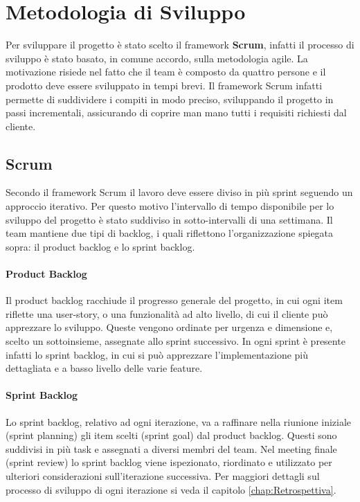 \section{Metodologia di Sviluppo}
Per sviluppare il progetto è stato scelto il framework \textbf{Scrum}, infatti il processo di sviluppo è stato basato, in comune accordo, sulla metodologia agile. La motivazione risiede nel fatto che il team è composto da quattro persone e il prodotto deve essere sviluppato in tempi brevi. Il framework Scrum infatti permette di suddividere i compiti in modo preciso, sviluppando il progetto in passi incrementali, assicurando di coprire man mano tutti i requisiti richiesti dal cliente.

    \subsection{Scrum}
    Secondo il framework Scrum il lavoro deve essere diviso in più sprint seguendo un approccio iterativo. Per questo motivo l'intervallo di tempo disponibile per lo sviluppo del progetto è stato suddiviso in sotto-intervalli di una settimana. 
    Il team mantiene due tipi di backlog, i quali riflettono l'organizzazione spiegata sopra: il product backlog e lo sprint backlog. 
    
    \paragraph{Product Backlog}Il product backlog racchiude il progresso generale del progetto, in cui ogni item riflette una user-story, o una funzionalità ad alto livello, di cui il cliente può apprezzare lo sviluppo. Queste vengono ordinate per urgenza e dimensione e, scelto un sottoinsieme, assegnate allo sprint successivo. In ogni sprint è presente infatti lo sprint backlog, in cui si può apprezzare l'implementazione più dettagliata e a basso livello delle varie feature. 

    \paragraph{Sprint Backlog} Lo sprint backlog, relativo ad ogni iterazione, va a raffinare nella riunione iniziale (sprint planning) gli item scelti (sprint goal) dal product backlog. Questi sono suddivisi in più task e assegnati a diversi membri del team. Nel meeting finale (sprint review) lo sprint backlog viene ispezionato, riordinato e utilizzato per ulteriori considerazioni sull'iterazione successiva. Per maggiori dettagli sul processo di sviluppo di ogni iterazione si veda il capitolo \ref{chap:Retrospettiva}.

